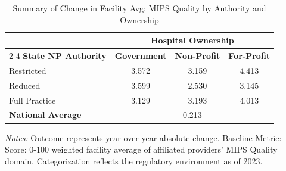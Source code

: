 \begin{table}[htbp]
    \centering
    \caption{Summary of Change in Facility Avg: MIPS Quality by Authority and Ownership}
    \label{tab:d_mips_quality_score_own}
    \vspace{0.2cm}
    \begin{tabular}{lccc}
        \toprule
        & \multicolumn{3}{c}{\textbf{Hospital Ownership}} \\
        \cmidrule(lr){2-4}
        \textbf{State NP Authority} & \textbf{Government} & \textbf{Non-Profit} & \textbf{For-Profit} \\
        \midrule
        Restricted & 3.572 & 3.159 & 4.413 \\
        Reduced & 3.599 & 2.530 & 3.145 \\
        Full Practice & 3.129 & 3.193 & 4.013 \\
        \midrule
        \textbf{National Average} & \multicolumn{3}{c}{0.213} \\
        \bottomrule
    \end{tabular}
    \vspace{0.1cm}
    \begin{minipage}{0.85\textwidth}
        \footnotesize \textit{Notes:} Outcome represents year-over-year absolute change. Baseline Metric: Score: 0-100 weighted facility average of affiliated providers' MIPS Quality domain. Categorization reflects the regulatory environment as of 2023.
    \end{minipage}
\end{table}